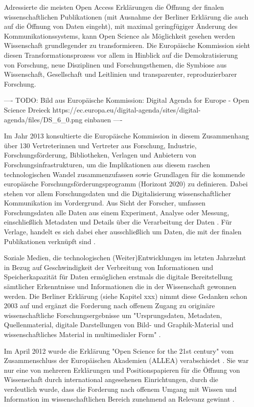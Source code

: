 Adressierte die meisten Open Access Erklärungen die Öffnung der finalen wissenschaftlichen Publikationen (mit Ausnahme der Berliner Erklärung die auch auf die Öffnung von Daten eingeht), mit maximal geringfügiger Änderung des Kommunikationssystems, kann Open Science als Möglichkeit gesehen werden Wissenschaft grundlegender zu transformieren. Die Europäische Kommission sieht diesen Transformationsprozess vor allem in Hinblick auf die Demokratisierung von Forschung, neue Disziplinen und Forschungsthemen, die Symbiose aus Wissenschaft, Gesellschaft und Leitlinien und transparenter, reproduzierbarer Forschung.

---- TODO: Bild aus Europäische Kommission: Digital Agenda for Europe - Open Science Dreieck https://ec.europa.eu/digital-agenda/sites/digital-agenda/files/DS_6_0.png einbauen ----

Im Jahr 2013 konsultierte die Europäische Kommission in diesem Zusammenhang über 130 Vertreterinnen und Vertreter aus Forschung, Industrie, Forschungsförderung, Bibliotheken, Verlagen und Anbietern von Forschungsinfrastrukturen, um die Implikationen aus diesem raschen technologischen Wandel zusammenzufassen sowie Grundlagen für die kommende europäische Forschungsförderungsprogramm (Horizont 2020) zu definieren. Dabei stehen vor allem Forschungsdaten und die Digitalisierung wissenschaftlicher Kommunikation im Vordergrund. Aus Sicht der Forscher, umfassen Forschungsdaten alle Daten aus einem Experiment, Analyse oder Messung, einschließlich Metadaten und Details über die Verarbeitung der Daten \cite{eu_consult_data_2013}. Für Verlage, handelt es sich dabei eher ausschließlich um Daten, die mit der finalen Publikationen verknüpft sind \cite{eu_consult_data_2013}.

Soziale Medien, die technologischen (Weiter)Entwicklungen im letzten Jahrzehnt in Bezug auf Geschwindigkeit der Verbreitung von Informationen und Speicherkapazität für Daten ermöglichen erstmals die digitale Bereitstellung sämtlicher Erkenntnisse und Informationen die in der Wissenschaft gewonnen werden. Die Berliner Erklärung (siehe Kapitel xxx) nimmt diese Gedanken schon 2003 auf und ergänzt die Forderung nach offenem Zugang zu originäre wissenschaftliche Forschungsergebnisse um "Ursprungsdaten, Metadaten, Quellenmaterial, digitale Darstellungen von Bild- und Graphik-Material und wissenschaftliches Material in multimedialer Form" \cite{berliner_erklaerung_2003}.

Im April 2012 wurde die Erklärung "Open Science for the 21st century" vom Zusammenschluss der Europäischen Akademien (ALLEA) verabschiedet \cite{ALLEA_2012}. Sie war nur eine von mehreren Erklärungen und Positionspapieren für die Öffnung von Wissenschaft durch international angesehenen Einrichtungen, durch die verdeutlich wurde, dass die Forderung nach offenem Umgang mit Wissen und Information im wissenschaftlichen Bereich zunehmend an Relevanz gewinnt \cite{schulze_2013_open}.


